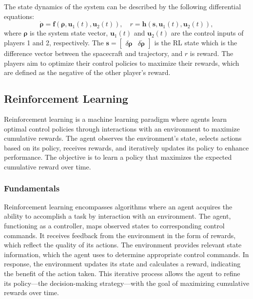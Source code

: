 \documentclass[conference]{IEEEtran}
\begin{document}
The state dynamics of the system can be described by the following differential equations:
\begin{equation}
	\dot{\boldsymbol{\rho}} = \boldsymbol{f}(\boldsymbol{\rho}, \boldsymbol{u}_1(t), \boldsymbol{u}_2(t)), \quad r = \boldsymbol{h}( \boldsymbol{s}, \boldsymbol{u}_1(t), \boldsymbol{u}_2(t)),
\end{equation}
where \( \boldsymbol{\rho} \) is the system state vector, \( \boldsymbol{u}_1(t) \) and \( \boldsymbol{u}_2(t) \) are the control inputs of players 1 and 2, respectively.
The \(\boldsymbol{s} = \begin{bmatrix}
	\delta \boldsymbol{\rho} & \delta \dot{\boldsymbol{\rho}}
\end{bmatrix}\) is the RL state which is the difference vector between the spacecraft and trajectory, and \( r \) is reward.
The players aim to optimize their control policies to maximize their rewards, which are defined as the negative of the other player's reward.

\subsection{Reinforcement Learning}
Reinforcement learning is a machine learning paradigm where agents learn optimal control policies through interactions with an environment to maximize cumulative rewards. The agent observes the environment's state, selects actions based on its policy, receives rewards, and iteratively updates its policy to enhance performance. The objective is to learn a policy that maximizes the expected cumulative reward over time.

\subsubsection{Fundamentals}
Reinforcement learning encompasses algorithms where an agent acquires the ability to accomplish a task by interaction with an environment. The agent, functioning as a controller, maps observed states to corresponding control commands.
It receives feedback from the environment in the form of rewards, which reflect the quality of its actions. The environment provides relevant state information, which the agent uses to determine appropriate control commands. In response, the environment updates its state and calculates a reward, indicating the benefit of the action taken. This iterative process allows the agent to refine its policy—the decision-making strategy—with the goal of maximizing cumulative rewards over time.
\end{document}
